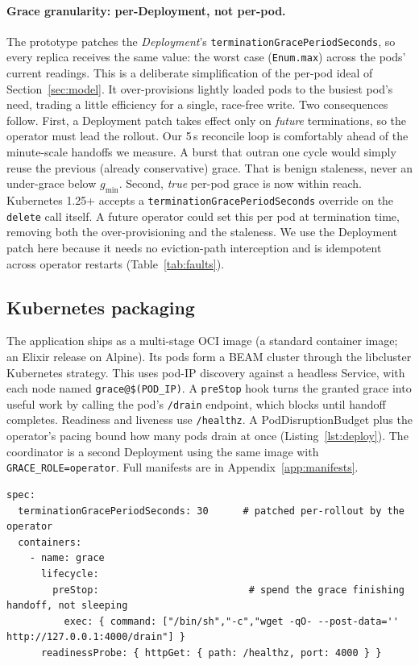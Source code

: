 \documentclass[AMA,Times1COL]{WileyNJDv5}
\begin{document}
\paragraph{Grace granularity: per-Deployment, not per-pod.} The prototype patches the
\emph{Deployment}'s \texttt{terminationGracePeriodSeconds}, so every replica receives the same
value: the worst case (\texttt{Enum.max}) across the pods' current readings. This is a deliberate
simplification of the per-pod ideal of Section~\ref{sec:model}. It over-provisions lightly loaded pods
to the busiest pod's need, trading a little efficiency for a single, race-free write. Two consequences
follow. First, a Deployment patch takes effect only on \emph{future} terminations, so the operator
must lead the rollout. Our 5\,s reconcile loop is comfortably ahead of the minute-scale handoffs we
measure. A burst that outran one cycle would simply reuse the previous (already conservative)
grace. That is benign staleness, never an under-grace below $g_{\min}$. Second, \emph{true} per-pod
grace is now within reach. Kubernetes 1.25+ accepts a \texttt{terminationGracePeriodSeconds} override on
the \texttt{delete} call itself. A future operator could set this per pod at termination time, removing
both the over-provisioning and the staleness. We use the Deployment patch here because it needs no
eviction-path interception and is idempotent across operator restarts (Table~\ref{tab:faults}).

\subsection{Kubernetes packaging}\label{sec:impl-pack}
The application ships as a multi-stage OCI image (a standard container image; an Elixir release on
Alpine). Its pods form a BEAM cluster through the libcluster Kubernetes strategy. This uses pod-IP
discovery against a headless Service, with each node named \texttt{grace@\$(POD\_IP)}. A
\texttt{preStop} hook turns the granted grace into useful work by calling the pod's \texttt{/drain}
endpoint, which blocks until handoff completes. Readiness and liveness use \texttt{/healthz}. A
PodDisruptionBudget plus the operator's pacing bound how many pods drain at once
(Listing~\ref{lst:deploy}). The coordinator is a second Deployment using the same image with
\texttt{GRACE\_ROLE=operator}. Full manifests are in Appendix~\ref{app:manifests}.

\begin{lstlisting}[caption={Deployment essentials (abridged): the adaptive \texttt{preStop} drain and the grace the operator patches at runtime.}, label=lst:deploy]
spec:
  terminationGracePeriodSeconds: 30      # patched per-rollout by the operator
  containers:
    - name: grace
      lifecycle:
        preStop:                          # spend the grace finishing handoff, not sleeping
          exec: { command: ["/bin/sh","-c","wget -qO- --post-data='' http://127.0.0.1:4000/drain"] }
      readinessProbe: { httpGet: { path: /healthz, port: 4000 } }
\end{lstlisting}
\end{document}
